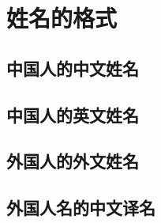 
\chapter{姓名的格式}\label{chap:names}

\section{中国人的中文姓名}

\section{中国人的英文姓名}

\section{外国人的外文姓名}

\section{外国人名的中文译名}

